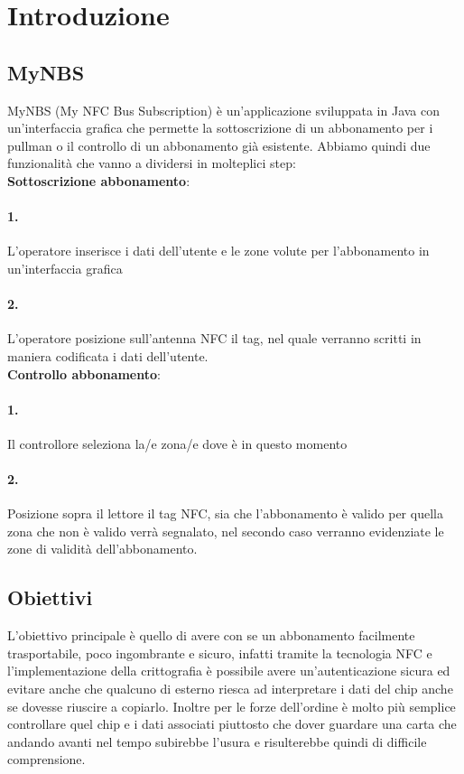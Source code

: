 \section{Introduzione}

\subsection{MyNBS}

MyNBS (My NFC Bus Subscription) è un'applicazione sviluppata in Java con un'interfaccia grafica che permette la sottoscrizione di un abbonamento per i pullman o il controllo di un abbonamento già esistente. Abbiamo quindi due funzionalità che vanno a dividersi in molteplici step: 
\\ \textbf{Sottoscrizione abbonamento}:
\paragraph{1.} L'operatore inserisce i dati dell'utente e le zone volute per l'abbonamento in un'interfaccia grafica
\paragraph{2.} L'operatore posizione sull'antenna NFC il tag, nel quale verranno scritti in maniera codificata i dati dell'utente.
\bigskip
\\\textbf{Controllo abbonamento}:
\paragraph{1.} Il controllore seleziona la/e zona/e dove è in questo momento
\paragraph{2.} Posizione sopra il lettore il tag NFC, sia che l'abbonamento è valido per quella zona che non è valido verrà segnalato, nel secondo caso verranno evidenziate le zone di validità dell'abbonamento.

\subsection{Obiettivi}

L'obiettivo principale è quello di avere con se un abbonamento facilmente trasportabile, poco ingombrante e sicuro, infatti tramite la tecnologia NFC e l'implementazione della crittografia è possibile avere un'autenticazione sicura ed evitare anche che qualcuno di esterno riesca ad interpretare i dati del chip anche se dovesse riuscire a copiarlo. Inoltre per le forze dell'ordine è molto più semplice controllare quel chip e i dati associati piuttosto che dover guardare una carta che andando avanti nel tempo subirebbe l'usura e risulterebbe quindi di difficile comprensione.